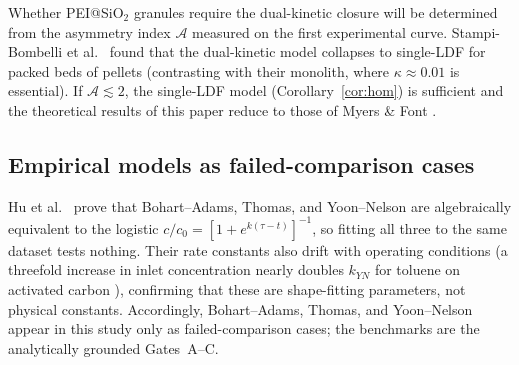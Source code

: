 \documentclass[a4paper]{amsart}
\theoremstyle{definition}
\begin{document}
Whether PEI@SiO$_2$ granules require the dual-kinetic closure will be
determined from the asymmetry index $\mathcal{A}$ measured on the first
experimental curve.  Stampi-Bombelli et al.\ \cite{Stampi2024} found that
the dual-kinetic model collapses to single-LDF for packed beds of pellets
(contrasting with their monolith, where $\kappa\approx0.01$ is essential).
If $\mathcal{A}\lesssim2$, the single-LDF model (Corollary~\ref{cor:hom})
is sufficient and the theoretical results of this paper reduce to those of
Myers \& Font \cite{MyersFont2020}.

\subsection{Empirical models as failed-comparison cases}

Hu et al.\ \cite{Hu2024} prove that Bohart--Adams, Thomas, and Yoon--Nelson
are algebraically equivalent to the logistic $c/c_0=[1+e^{k(\tau-t)}]^{-1}$,
so fitting all three to the same dataset tests nothing.  Their rate
constants also drift with operating conditions (a threefold increase in
inlet concentration nearly doubles $k_{YN}$ for toluene on activated
carbon \cite{Hu2024}), confirming that these are shape-fitting parameters,
not physical constants.  Accordingly, Bohart--Adams, Thomas, and Yoon--Nelson
appear in this study only as failed-comparison cases; the benchmarks are the
analytically grounded Gates~A--C.
\end{document}
